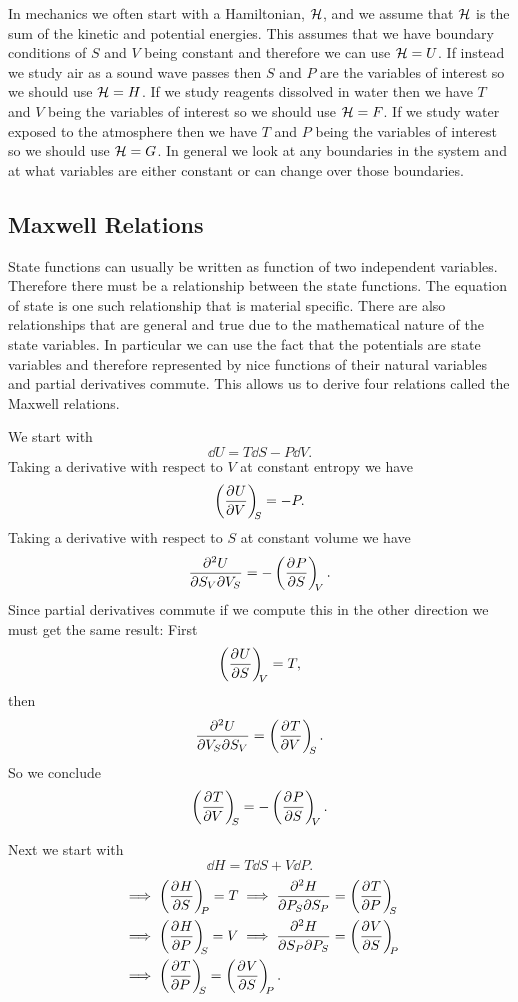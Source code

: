 \documentclass[a4paper]{article}
\begin{document}
    In mechanics we often start with a Hamiltonian, \(\mathcal{H}\), and we assume that \(\mathcal{H}\) is the sum of the kinetic and potential energies.
    This assumes that we have boundary conditions of \(S\) and \(V\) being constant and therefore we can use \(\mathcal{H} = U\).
    If instead we study air as a sound wave passes then \(S\) and \(P\) are the variables of interest so we should use \(\mathcal{H} = H\).
    If we study reagents dissolved in water then we have \(T\) and \(V\) being the variables of interest so we should use \(\mathcal{H} = F\).
    If we study water exposed to the atmosphere then we have \(T\) and \(P\) being the variables of interest so we should use \(\mathcal{H} = G\).
    In general we look at any boundaries in the system and at what variables are either constant or can change over those boundaries.
    
    \subsection{Maxwell Relations}
    State functions can usually be written as function of two independent variables.
    Therefore there must be a relationship between the state functions.
    The equation of state is one such relationship that is material specific.
    There are also relationships that are general and true due to the mathematical nature of the state variables.
    In particular we can use the fact that the potentials are state variables and therefore represented by nice functions of their natural variables and partial derivatives commute.
    This allows us to derive four relations called the Maxwell relations.
    
    We start with
    \[\dd{U} = T\dd{S} - P\dd{V}.\]
    Taking a derivative with respect to \(V\) at constant entropy we have
    \[\left(\pdv[]{U}{V}\right)_{\!\!{S}} = -P.\]
    Taking a derivative with respect to \(S\) at constant volume we have
    \[\frac{\partial^2{U}}{\partial{S_V}\partial{V_S}} = -\left(\pdv[]{P}{S}\right)_{\!\!{V}}.\]
    Since partial derivatives commute if we compute this in the other direction we must get the same result:
    First
    \[\left(\pdv[]{U}{S}\right)_{\!\!{V}} = T,\]
    then
    \[\frac{\partial^2{U}}{\partial{V_S}\partial{S_V}} = \left(\pdv[]{T}{V}\right)_{\!\!{S}}.\]
    So we conclude
    \[\left(\pdv[]{T}{V}\right)_{\!\!{S}} = -\left(\pdv[]{P}{S}\right)_{\!\!{V}}.\]
    
    Next we start with
    \[\dd{H} = T\dd{S} + V\dd{P}.\]
    \begin{align*}
        &\implies \pdvconst{H}{S}{P} = T \implies \pdvsec{H}{P_S}{S_P} = \pdvconst{T}{P}{S}\\
        &\implies \pdvconst{H}{P}{S} = V \implies \pdvsec{H}{S_P}{P_S} = \pdvconst{V}{S}{P}\\
        &\implies \pdvconst{T}{P}{S} = \pdvconst{V}{S}{P}.
    \end{align*}
\end{document}
